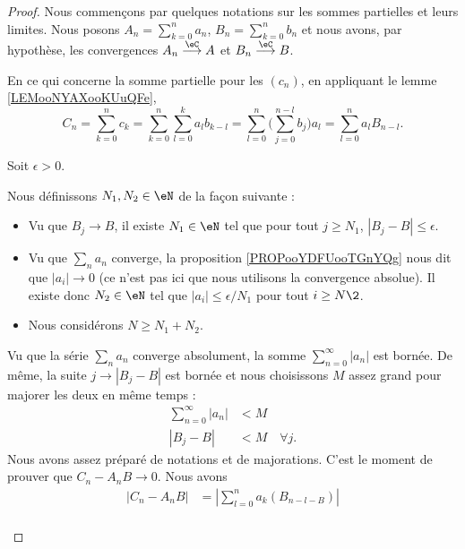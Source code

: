 \begin{proof}
	Nous commençons par quelques notations sur les sommes partielles et leurs limites. Nous posons \( A_n=\sum_{k=0}^na_n\), \( B_n=\sum_{k=0}^nb_n\) et nous avons, par hypothèse, les convergences \( A_n\stackrel{\eC}{\longrightarrow}A\) et \( B_n\stackrel{\eC}{\longrightarrow}B\).

	En ce qui concerne la somme partielle pour les \( (c_n)\), en appliquant le lemme \ref{LEMooNYAXooKUuQFe},
	\begin{equation}
		C_n=\sum_{k=0}^nc_k=\sum_{k=0}^n\sum_{l=0}^ka_lb_{k-l}=\sum_{l=0}^n\big( \sum_{j=0}^{n-l}b_j \big)a_l=\sum_{l=0}^na_lB_{n-l}.
	\end{equation}

	Soit \( \epsilon>0\).
	\begin{subproof}
		Nous définissons \( N_1, N_2\in \eN\) de la façon suivante :
		\begin{itemize}
			\item
			      Vu que \( B_j\to B\), il existe \( N_1\in \eN\) tel que pour tout \( j\geq N_1\), \( | B_j-B |\leq \epsilon\).
			\item
			      Vu que \( \sum_na_n\) converge, la proposition \ref{PROPooYDFUooTGnYQg} nous dit que \( | a_i |\to 0\) (ce n'est pas ici que nous utilisons la convergence absolue). Il existe donc \( N_2\in \eN\) tel que \( | a_i |\leq \epsilon/N_1\) pour tout \( i\geq N\2\).
			\item
			      Nous considérons \( N\geq N_1+N_2\).
		\end{itemize}
		\spitem[Un majorant]
		Vu que la série \( \sum_na_n\) converge absolument, la somme \( \sum_{n=0}^{\infty}| a_n |\) est bornée. De même, la suite \( j\to| B_j-B |\) est bornée et nous choisissons \( M\) assez grand pour majorer les deux en même temps :
		\begin{subequations}
			\begin{align}
				\sum_{n=0}^{\infty}| a_n | & <M           \label{SUBEQooBKCVooXnampA} \\
				| B_j-B |                  & <M\quad \forall j.
			\end{align}
		\end{subequations}
		Nous avons assez préparé de notations et de majorations. C'est le moment de prouver que \( C_n-A_nB \to 0\). Nous avons
		\begin{subequations}
			\begin{align}
				| C_n-A_nB | & =| \sum_{l=0}^na_k(B_{n-l-B}) |                                                                    \\

\end{align}
\end{subequations}
\end{subproof}
\end{proof}
